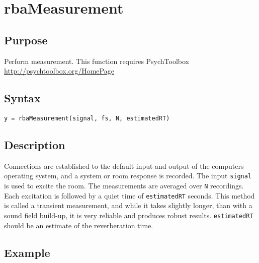 
\chapter{rbaMeasurement} %
\label{cha:rbaMeasurement} %

\section{Purpose} %
\label{sec:rbaMeasurement_purpose}
Perform measurement.
This function requires PsychToolbox \url{http://psychtoolbox.org/HomePage}


\section{Syntax} %
\label{sec:rbaMeasurement_syntax}

\texttt{y = rbaMeasurement(signal, fs, N, estimatedRT)}


\section{Description} %
\label{sec:rbaMeasurement_description}

Connections are established to the default input and output of the computers operating system, and a system or room response is recorded. The input \texttt{signal} is used to excite the room. The measurements are averaged over \texttt{N} recordings.\\
Each excitation is followed by a quiet time of \texttt{estimatedRT} seconds. This method is called a transient measurement, and while it takes slightly longer, than with a sound field build-up, it is very reliable and produces robust results. \texttt{estimatedRT} should be an estimate of the reverberation time.


\section{Example} %
\label{sec:rbaMeasurement_example}

